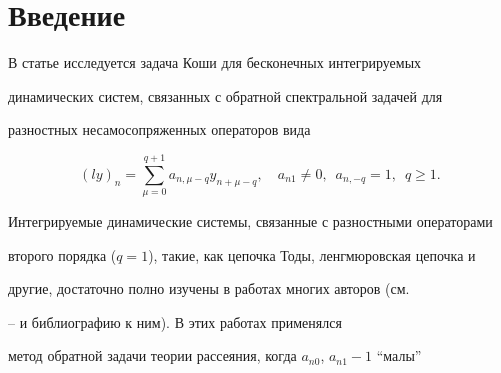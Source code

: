 \date{} 




 


\pagestyle{plain} %


 


 




 


\maketitle 


\label{begin} 


 


\section*{Введение} 


 


В статье исследуется задача Коши для бесконечных интегрируемых 


динамических систем, связанных с обратной спектральной задачей для 


разностных несамосопряженных операторов вида 


\begin{equation} 


(ly)_n=\sum^{q+1}_{\mu=0}a_{n,\mu-q}y_{n+\mu-q},\quad 


a_{n1}\ne 0,\ \; a_{n,-q}=1,\ \; q\ge 1. 


\end{equation} 


 


Интегрируемые динамические системы, связанные с разностными операторами 


второго порядка ($q=1$), такие, как цепочка Тоды, ленгмюровская цепочка и 


другие, достаточно полно изучены в работах многих авторов (см. 


\cite{1}--\cite{5} и библиографию к ним). В этих работах применялся 


метод обратной задачи теории рассеяния, когда $a_{n0}$, $a_{n1}-1$ ``малы''


